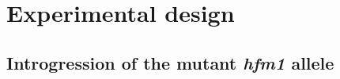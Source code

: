 %
%
%


%
%



\section{Experimental design}
\subsection{Introgression of the mutant \textit{hfm1} allele}




